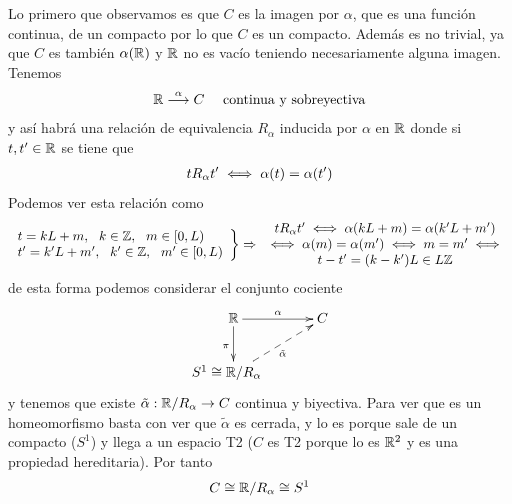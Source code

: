 \begin{ejemplo}
\begin{enumerate}
        Lo primero que observamos es que $C$ es la imagen por $\alpha$, que es una función continua, de un compacto por lo que $C$ es un compacto. Además es no trivial, ya que $C$ es también $\alpha(\mathbb{R})$ y $\mathbb{R}$ no es vacío teniendo necesariamente alguna imagen. Tenemos
        \begin{gather*}
            \mathbb{R} \overset{\alpha}{\longrightarrow} C \quad \text{ continua y sobreyectiva}
        \end{gather*} 
        y así habrá una relación de equivalencia $R_\alpha$ inducida por $\alpha$ en $\mathbb{R}$ donde si $t,t'\in \mathbb{R}$ se tiene que 
        \begin{gather*}
            t R_\alpha t' \iff \alpha(t) = \alpha(t')
        \end{gather*}
        Podemos ver esta relación como
        \begin{gather*}
            \left.
            \begin{array}{l}
                t = kL + m,\ \  k\in \mathbb{Z},\ \  m\in [0,L)\\
                t' = k'L + m',\ \ k'\in \mathbb{Z},\ \  m'\in [0,L)
            \end{array}
            \right\} \Rightarrow 
            \begin{array}{c}
                t R_\alpha t' \iff \alpha(kL + m) = \alpha(k'L + m') \\ 
                \iff \alpha(m)=\alpha(m') \iff m=m' \iff\\
                t-t' = (k-k')L\in L\mathbb{Z}
            \end{array}
        \end{gather*}
        de esta forma podemos considerar el conjunto cociente
        \begin{gather*}
            \xymatrix{
                \bb{R} \ar[r]^\alpha \ar[d]_\pi & C \\
                S^1 \cong \bb{R} / R_\alpha \quad \ar@{-->}[ur]_{\tilde{\alpha}}
            }
        \end{gather*}
        y tenemos que existe $\tilde{\alpha} : \mathbb{R}/R_\alpha \to C$ continua y biyectiva. Para ver que es un homeomorfismo basta con ver que $\tilde{\alpha}$ es cerrada, y lo es porque sale de un compacto ($S^1$) y llega a un espacio T2 ($C$ es T2 porque lo es $\mathbb{R}^2$ y es una propiedad hereditaria). Por tanto
        \begin{gather*}
            C \cong \mathbb{R}/R_\alpha \cong S^1
        \end{gather*}

\end{enumerate}
\end{ejemplo}
